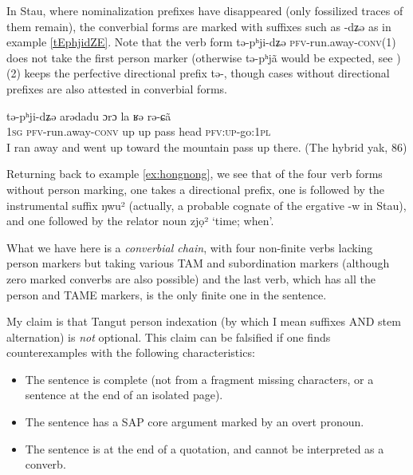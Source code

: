 \documentclass[oldfontcommands,oneside,a4paper,11pt]{article}
\newcommand{\ipa}[1]{{\phon \mbox{#1}}} %
\begin{document}
In Stau, where nominalization prefixes have disappeared (only  fossilized traces of them remain), the converbial forms are marked with suffixes such as \ipa{-dʑə} as in example \ref{tEphjidZE}. Note that the verb form \ipa{tə-pʰji-dʑə} \textsc{pfv}-run.away-\textsc{conv}(1) does not take the first person marker (otherwise \ipa{tə-pʰjã} would be expected, see \citealt{jacques14rtau}) (2) keeps the perfective directional prefix \ipa{tə-}, though cases without directional prefixes are also attested in converbial forms.

\begin{exe}
\ex \label{tEphjidZE}
\gll \ipa{ŋa} 	\ipa{tə-pʰji-dʑə} 	\ipa{arədadu} 	\ipa{ɔrɔ} 	\ipa{la} 	\ipa{ʁə} 	\ipa{rə-ɕã} \\
 \textsc{1sg} \textsc{pfv}-run.away-\textsc{conv} up up pass head \textsc{pfv:up}-go:\textsc{1pl} \\
\glt I ran away and went up toward the mountain pass up there. (The hybrid yak, 86) 
\end{exe}

Returning back to example \ref{ex:hongnong}, we see that of the four verb forms without person marking, one takes a directional prefix, one is followed by the instrumental suffix  \ipa{ŋwu²} (actually, a probable cognate of the ergative \ipa{-w} in Stau), and one followed by the relator noun  \ipa{zjọ²} `time; when'. 

What we have here is a \textit{converbial chain}, with four non-finite verbs lacking person markers but taking various TAM and subordination markers (although zero marked converbs are also possible) and the last verb, which has all the person and TAME markers, is the only finite one in the sentence.

My claim is that Tangut person indexation (by which I mean suffixes AND stem alternation) is \textit{not} optional. This claim can be falsified if one finds counterexamples with the following characteristics:

\begin{itemize}
\item The sentence is complete (not from a fragment missing characters, or a sentence at the end of an isolated page).
\item The sentence has a SAP core argument marked by an overt pronoun.
\item The sentence is at the end of a quotation, and cannot be interpreted as a converb.
\end{itemize}
\end{document}

